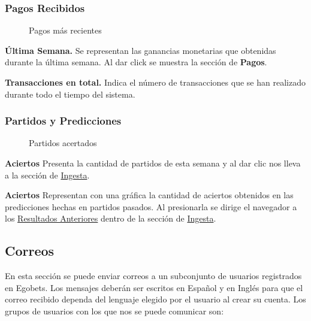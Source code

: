 \subsubsection{Pagos Recibidos}

\begin{figure}[!htb]\centering
   \begin {minipage}{0.5\textwidth}
     \caption{Pagos más recientes}
	 \label{Fig:ultimos-pagos}
   \end{minipage}
\end{figure}

\textbf{Última Semana.}
Se representan las ganancias monetarias que obtenidas durante la última semana. Al dar click se muestra la sección de \textbf{Pagos}.

\textbf{Transacciones en total.}
Indica el número de transacciones que se han realizado durante todo el tiempo del sistema.

\subsubsection{Partidos y Predicciones}

\begin{figure}[!htb]\centering
   \begin {minipage}{0.5\textwidth}
     \caption{Partidos acertados}
	 \label{Fig:partidos-acertados}
   \end{minipage}
\end{figure}

\textbf{Aciertos}
Presenta la cantidad de partidos de esta semana y al dar clic nos lleva a la sección de \underline{Ingesta}.

\textbf{Aciertos}
Representan con una gráfica la cantidad de aciertos obtenidos en las predicciones hechas en partidos pasados. Al presionarla se dirige el navegador a los \underline{Resultados Anteriores} dentro de la sección de \underline{Ingesta}.

\subsection{Correos}

En esta sección se puede enviar correos a un subconjunto de usuarios registrados en Egobets. Los mensajes deberán ser escritos en Español y en Inglés para que el correo recibido dependa del lenguaje elegido por el usuario al crear su cuenta. Los grupos de usuarios con los que nos se puede comunicar son:

